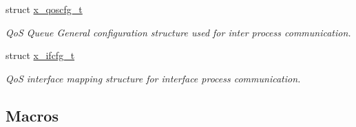 \begin{DoxyCompactItemize}
struct \hyperlink{structx__qoscfg__t}{x\-\_\-qoscfg\-\_\-t}
\begin{DoxyCompactList}\small\item\em Qo\-S Queue General configuration structure used for inter process communication. \end{DoxyCompactList}\item 
struct \hyperlink{structx__ifcfg__t}{x\-\_\-ifcfg\-\_\-t}
\begin{DoxyCompactList}\small\item\em Qo\-S interface mapping structure for interface process communication. \end{DoxyCompactList}\end{DoxyCompactItemize}
\subsection*{Macros}
